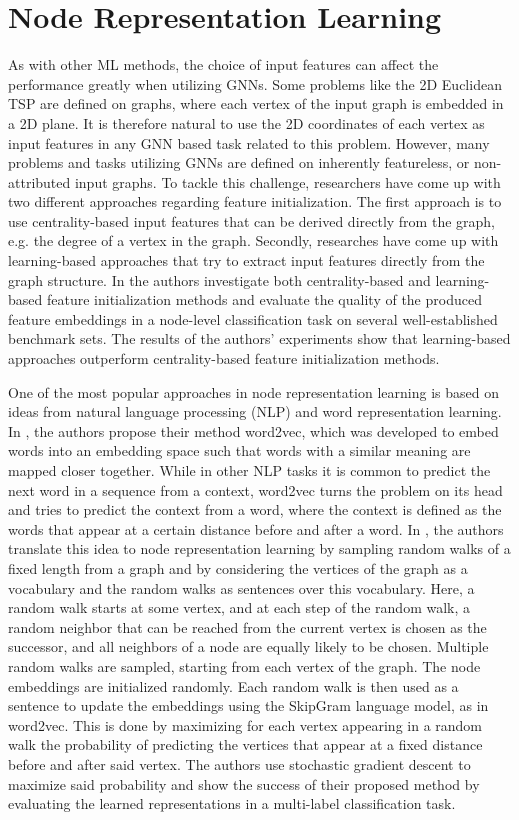 \documentclass[draft,final]{vutinfth} %
\begin{document}
\section{Node Representation Learning}\label{sec:node-representation}

As with other ML methods, the choice of input features can affect the performance greatly when utilizing GNNs. 
Some problems like the 2D Euclidean TSP are defined on graphs, where each vertex of the input graph is embedded in a 2D plane. It is therefore natural to use the 2D coordinates of each vertex as input features in any GNN based task related to this problem. 
However, many problems and tasks utilizing GNNs are defined on inherently featureless, or non-attributed input graphs. 
To tackle this challenge, researchers have come up with two different approaches regarding feature initialization. The first approach is to use centrality-based input features that can be derived directly from the graph, e.g. the degree of a vertex in the graph. Secondly, researches have come up with learning-based approaches that try to extract input features directly from the graph structure. In \cite{Duong2019} the authors investigate both centrality-based and learning-based feature initialization methods and evaluate the quality of the produced feature embeddings in a node-level classification task on several well-established benchmark sets. The results of the authors' experiments show that learning-based approaches outperform centrality-based feature initialization methods. 

One of the most popular approaches in node representation learning is based on ideas from natural language processing (NLP) and word representation learning. In \cite{Mikolov2013}, the authors propose their method word2vec, which was developed to embed words into an embedding space such that words with a similar meaning are mapped closer together. While in other NLP tasks it is common to predict the next word in a sequence from a context, word2vec turns the problem on its head and tries to predict the context from a word, where the context is defined as the words that appear at a certain distance before and after a word. 
In \cite{Perozzi2014}, the authors translate this idea to node representation learning by sampling random walks of a fixed length from a graph and by considering the vertices of the graph as a vocabulary and the random walks as sentences over this vocabulary. Here, a random walk starts at some vertex, and at each step of the random walk, a random neighbor that can be reached from the current vertex is chosen as the successor, and all neighbors of a node are equally likely to be chosen. Multiple random walks are sampled, starting from each vertex of the graph. 
The node embeddings are initialized randomly. Each random walk is then used as a sentence to update the embeddings using the SkipGram language model, as in word2vec. This is done by maximizing for each vertex appearing in a random walk the probability of predicting the vertices that appear at a fixed distance before and after said vertex. The authors use stochastic gradient descent to maximize said probability and show the success of their proposed method by evaluating the learned representations in a multi-label classification task. 
\end{document}
